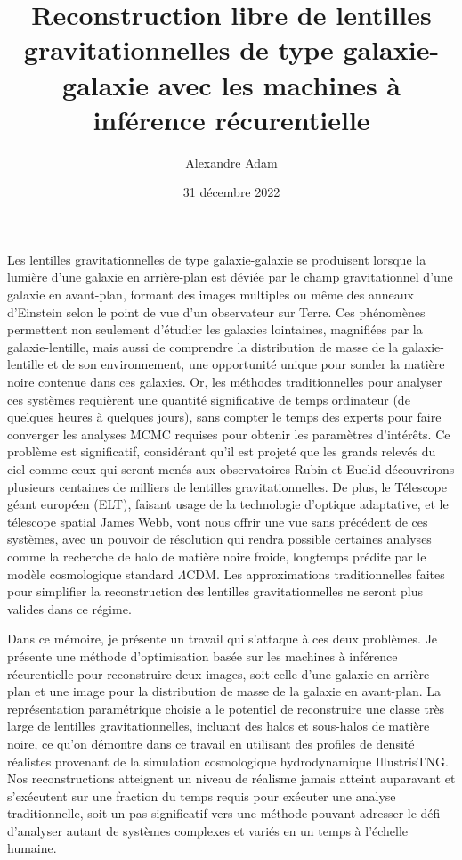 \documentclass[
  normalmargins,
  11pt,
  openany,
  onehalfspacing,
]{ut-thesis}
\author{Alexandre Adam}
\title{Reconstruction libre de lentilles gravitationnelles de type galaxie-galaxie avec les machines à inférence récurentielle}
\date{31 décembre 2022}
\begin{document}
  \frontmatter
    \maketitle
    \maketitletwo
    \begin{resume}
	Les lentilles gravitationnelles de type galaxie-galaxie se produisent lorsque la lumière d'une galaxie 
	en arrière-plan est déviée par le champ gravitationnel d'une galaxie en avant-plan, formant 
	des images multiples ou même des anneaux d'Einstein selon le point de vue d'un observateur sur Terre. 
	Ces phénomènes permettent non seulement 
	d'étudier les galaxies lointaines, magnifiées par la galaxie-lentille, mais aussi de comprendre la distribution 
	de masse de la galaxie-lentille et de son environnement, une opportunité unique pour 
	sonder la matière noire contenue dans ces galaxies. 
	Or, les méthodes traditionnelles pour analyser ces systèmes requièrent une quantité 
	significative de temps ordinateur (de quelques heures à quelques jours), sans compter le temps des 
	experts pour faire converger les analyses MCMC requises pour obtenir les paramètres d'intérêts. 
	Ce problème est significatif, considérant qu'il est projeté que  
	les grands relevés du ciel comme ceux qui seront menés aux observatoires Rubin et Euclid découvrirons plusieurs 
	centaines de milliers de lentilles gravitationnelles.  
	De plus, le Télescope géant européen (ELT), faisant usage de la technologie d'optique adaptative, 
	et le télescope spatial James Webb, vont nous offrir une vue sans précédent de ces systèmes, avec un 
	pouvoir de résolution qui rendra possible certaines analyses comme la recherche de halo de matière noire froide, 
	longtemps prédite par le modèle cosmologique standard $\Lambda$CDM. Les approximations traditionnelles faites pour 
	simplifier la reconstruction des lentilles gravitationnelles ne seront plus valides dans ce régime.

	Dans ce mémoire, je présente un travail qui s'attaque à ces deux problèmes. Je présente une 
	méthode d'optimisation basée sur les machines à inférence récurentielle pour reconstruire 
	deux images, soit celle d'une galaxie en arrière-plan et une image pour la distribution de masse 
	de la galaxie en avant-plan. La représentation paramétrique choisie a le potentiel de reconstruire 
	une classe très large de lentilles gravitationnelles, incluant des halos et sous-halos de matière noire, 
	ce qu'on démontre dans ce travail en utilisant des profiles de densité réalistes provenant de 
	la simulation cosmologique hydrodynamique IllustrisTNG. 
	Nos reconstructions atteignent un niveau de réalisme jamais atteint auparavant 
        et s'exécutent sur une fraction du temps requis pour exécuter une analyse traditionnelle, soit un pas 
	significatif vers une méthode pouvant adresser le défi d'analyser autant de systèmes complexes et variés en 
	un temps à l'échelle humaine.
        

\end{resume}
\end{document}
